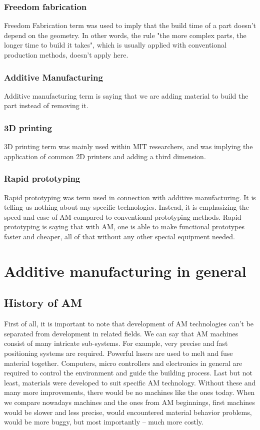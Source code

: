 \documentclass[a4paper, 11pt, reqno]{report}
\begin{document}
\subsection{Freedom fabrication}
Freedom Fabrication term was used to imply that the build time of a part doesn't depend on the geometry. In other words, the rule "the more complex parts, the longer time to build it takes", which is usually applied with conventional production methods, doesn't apply here.
\subsection{Additive Manufacturing}
Additive manufacturing term is saying that we are adding material to build the part instead of removing it.
\subsection{3D printing}
3D printing term was mainly used within MIT researchers, and was implying the application of common 2D printers and adding a third dimension.
\subsection{Rapid prototyping}
Rapid prototyping was term used in connection with additive manufacturing. It is telling us nothing about any specific technologies. Instead, it is emphasizing the speed and ease of AM compared to conventional prototyping methods. Rapid prototyping is saying that with AM, one is able to make functional prototypes faster and cheaper, all of that without any other special equipment needed.\\

%
%
%
\chapter{Additive manufacturing in general}
%
\section{History of AM}
First of all, it is important to note that development of AM technologies can't be separated from development in related fields. We can say that AM machines consist of many intricate sub-systems. For example, very precise and fast positioning systems are required. Powerful lasers are used to melt and fuse material together. Computers, micro controllers and electronics in general are required to control the environment and guide the building process. Last but not least, materials were developed to suit specific AM technology. Without these and many more improvements, there would be no machines like the ones today. When we compare nowadays machines and the ones from AM beginnings, first machines would be slower and less precise, would encountered material behavior problems, would be more buggy, but most importantly – much more costly.
\end{document}
